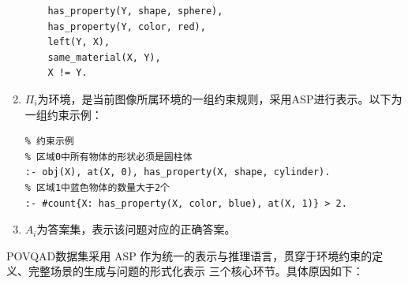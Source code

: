 \begin{enumerate}[nosep]
\begin{lstlisting}
    has_property(Y, shape, sphere),
    has_property(Y, color, red),
    left(Y, X),
    same_material(X, Y),
    X != Y.
\end{lstlisting}
\item \textbf{$\Pi_i$}为环境，是当前图像所属环境的一组约束规则，采用ASP进行表示。以下为一组约束示例：
\begin{lstlisting}
% 约束示例
% 区域0中所有物体的形状必须是圆柱体
:- obj(X), at(X, 0), has_property(X, shape, cylinder).
% 区域1中蓝色物体的数量大于2个
:- #count{X: has_property(X, color, blue), at(X, 1)} > 2.
\end{lstlisting}
\item \textbf{$A_i$}为答案集，表示该问题对应的正确答案。
\end{enumerate}

POVQAD数据集采用 ASP 作为统一的表示与推理语言，贯穿于环境约束的定义、完整场景的生成与问题的形式化表示
三个核心环节。具体原因如下：
